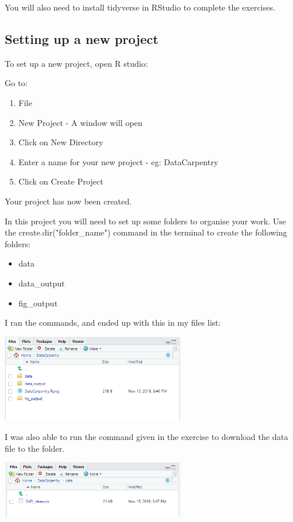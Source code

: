 \documentclass{article}
\begin{document}
You will also need to install tidyverse in RStudio to complete the exercises.


\subsection{Setting up a new project}

To set up a new project, open R studio:

Go to:
\begin{enumerate}
    \item File
    \item New Project - A window will open
    \item Click on New Directory
    \item Enter a name for your new project - eg: DataCarpentry
    \item Click on Create Project 
\end{enumerate}

Your project has now been created.

In this project you will need to set up some folders to organise your work. Use the create.dir("folder\_name") command in the terminal to create the following folders:
\begin{itemize}
    \item data
    \item data\_output
    \item fig\_output
\end{itemize}

I ran the commands, and ended up with this in my files list:

\includegraphics[width=8cm]{Images/RStudio001.PNG}

I was also able to run the command given in the exercise to download the data file to the folder.

\includegraphics[width=8cm]{Images/RStudio002.PNG}
\end{document}
